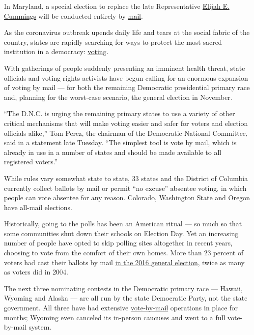In Maryland, a special election to replace the late Representative
\href{https://www.nytimes3xbfgragh.onion/2019/10/17/us/politics/elijah-cummings-death-illness.html}{Elijah
E. Cummings} will be conducted entirely by
\href{https://www.nytimes3xbfgragh.onion/2020/04/10/us/politics/vote-by-mail.html}{mail}.

As the coronavirus outbreak upends daily life and tears at the social
fabric of the country, states are rapidly searching for ways to protect
the most sacred institution in a democracy:
\href{https://www.nytimes3xbfgragh.onion/2020/04/10/us/politics/vote-by-mail.html}{voting}.

With gatherings of people suddenly presenting an imminent health threat,
state officials and voting rights activists have begun calling for an
enormous expansion of voting by mail --- for both the remaining
Democratic presidential primary race and, planning for the worst-case
scenario, the general election in November.

``The D.N.C. is urging the remaining primary states to use a variety of
other critical mechanisms that will make voting easier and safer for
voters and election officials alike,'' Tom Perez, the chairman of the
Democratic National Committee, said in a statement late Tuesday. ``The
simplest tool is vote by mail, which is already in use in a number of
states and should be made available to all registered voters.''

While rules vary somewhat state to state, 33 states and the District of
Columbia currently collect ballots by mail or permit ``no excuse''
absentee voting, in which people can vote absentee for any reason.
Colorado, Washington State and Oregon have all-mail elections.

Historically, going to the polls has been an American ritual --- so much
so that some communities shut down their schools on Election Day. Yet an
increasing number of people have opted to skip polling sites altogether
in recent years, choosing to vote from the comfort of their own homes.
More than 23 percent of voters had cast their ballots by mail
\href{https://www.eac.gov/documents/2017/10/17/eavs-deep-dive-early-absentee-and-mail-voting-data-statutory-overview}{in
the 2016 general election}, twice as many as voters did in 2004.

The next three nominating contests in the Democratic primary race ---
Hawaii, Wyoming and Alaska --- are all run by the state Democratic
Party, not the state government. All three have had extensive
\href{https://www.nytimes3xbfgragh.onion/2020/06/19/us/politics/nyc-vote-by-mail.html}{vote-by-mail}
operations in place for months; Wyoming even canceled its in-person
caucuses and went to a full vote-by-mail system.

